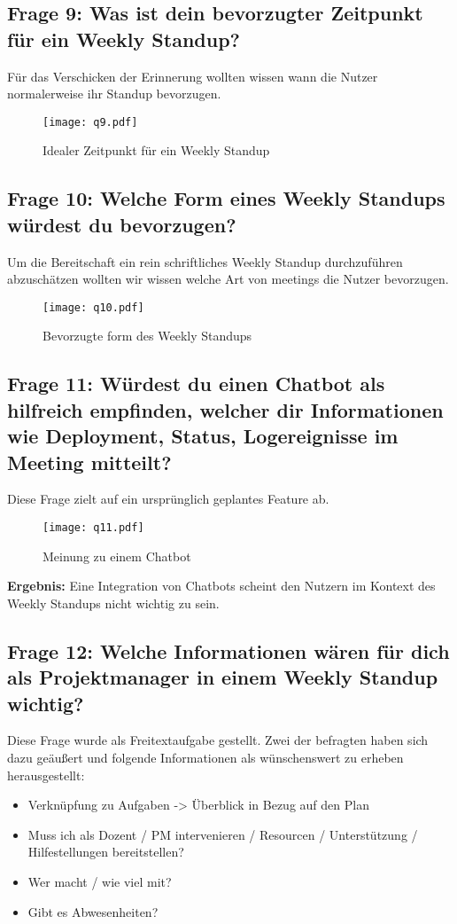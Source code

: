 \subsection{Frage 9: Was ist dein bevorzugter Zeitpunkt für ein Weekly Standup?}
Für das Verschicken der Erinnerung wollten wissen wann die Nutzer normalerweise ihr Standup bevorzugen.
\begin{figure}[H]
	\centering
	\texttt{[image: q9.pdf]}
    \caption{Idealer Zeitpunkt für ein Weekly Standup}
	\label{fig:q9}
\end{figure}  
\subsection{Frage 10: Welche Form eines Weekly Standups würdest du bevorzugen?}
Um die Bereitschaft ein rein schriftliches Weekly Standup durchzuführen abzuschätzen wollten wir wissen welche Art von meetings die Nutzer bevorzugen.
\begin{figure}[H]
	\centering
	\texttt{[image: q10.pdf]}
    \caption{Bevorzugte form des Weekly Standups}
	\label{fig:q10}
\end{figure} 
\subsection{Frage 11: Würdest du einen Chatbot als hilfreich empfinden, welcher dir Informationen wie Deployment, Status, Logereignisse im Meeting mitteilt?}
Diese Frage zielt auf ein ursprünglich geplantes Feature ab.
\begin{figure}[H]
	\centering
	\texttt{[image: q11.pdf]}
    \caption{Meinung zu einem Chatbot}
	\label{fig:q11}
\end{figure} 
\textbf{Ergebnis:} Eine Integration von Chatbots scheint den Nutzern im Kontext des Weekly Standups nicht wichtig zu sein.

\subsection{Frage 12: Welche Informationen wären für dich als Projektmanager in einem Weekly Standup wichtig?}
Diese Frage wurde als Freitextaufgabe gestellt. Zwei der befragten haben sich dazu geäußert und folgende Informationen als wünschenswert zu erheben herausgestellt:
\begin{itemize}
\item Verknüpfung zu Aufgaben -> Überblick in Bezug auf den Plan
\item Muss ich als Dozent / PM intervenieren / Resourcen / Unterstützung / Hilfestellungen bereitstellen? 
\item Wer macht / wie viel mit? 
\item Gibt es Abwesenheiten?
\end{itemize}

